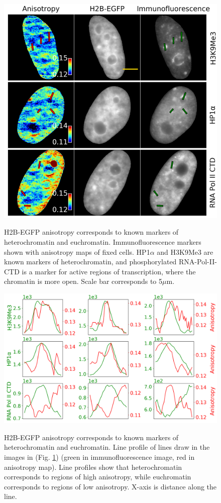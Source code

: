 \begin{figure}[!hbtp]
    {\hfill\includegraphics[trim=0 5 0 30, clip,width=0.8\linewidth]{figures/1.png}\hspace*{\fill}}
    \caption{H2B-EGFP anisotropy corresponds to known markers of heterochromatin and euchromatin. Immunofluorescence markers shown with anisotropy maps of fixed cells. HP1$\alpha$ and H3K9Me3 are known markers of heterochromatin, and phosphorylated RNA-Pol-II-CTD is a marker for active regions of transcription, where the chromatin is more open. Scale bar corresponds to 5$\mu$m.}
    {\label{fig:an_verify}}
\end{figure}

\begin{figure}[!hbtp]
    {\hfill\includegraphics[clip,width=0.8\linewidth]{figures/2.png}\hspace*{\fill}}
    \caption{H2B-EGFP anisotropy corresponds to known markers of heterochromatin and euchromatin. Line profile of lines draw in the images in (Fig. \ref{fig:an_verify}) (green in immunofluorescence image, red in anisotropy map). Line profiles show that heterochromatin corresponds to regions of high anisotropy, while euchromatin corresponds to regions of low anisotropy. X-axis is distance along the line.}
    {\label{fig:an_verify_line}}
\end{figure}

